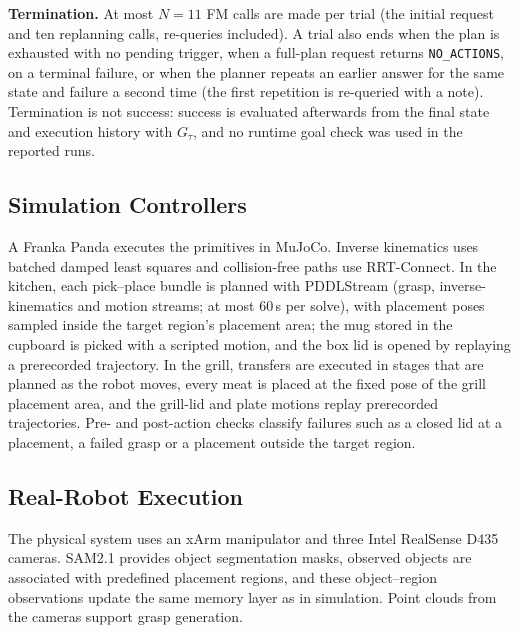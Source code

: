 \noindent\textbf{Termination.} At most $N=11$ FM calls are made per trial (the initial request and ten
replanning calls, re-queries included). A trial also ends when the plan is exhausted with no pending trigger,
when a full-plan request returns \texttt{NO\_ACTIONS}, on a terminal failure, or when the planner repeats an
earlier answer for the same state and failure a second time (the first repetition is re-queried with a note). Termination is not
success: success is evaluated afterwards from the final state and execution history with $G_\tau$, and no
runtime goal check was used in the reported runs.

\subsection{Simulation Controllers}
\label{sec:supp-controllers}
A Franka Panda executes the primitives in MuJoCo. Inverse kinematics uses batched damped least squares and
collision-free paths use RRT-Connect. In the kitchen, each pick--place bundle is planned with PDDLStream (grasp,
inverse-kinematics and motion streams; at most 60\,s per solve), with placement poses sampled inside the
target region's placement area; the mug stored in the cupboard is picked with a scripted motion, and the box lid
is opened by replaying a prerecorded trajectory. In the grill, transfers are executed in stages that are planned
as the robot moves, every meat is placed at the fixed pose of the grill placement area, and the grill-lid and
plate motions replay prerecorded trajectories. Pre- and post-action checks classify failures such as a closed lid
at a placement, a failed grasp or a placement outside the target region.

\subsection{Real-Robot Execution}
\label{sec:supp-real}
The physical system uses an xArm manipulator and three Intel RealSense D435 cameras. SAM2.1 provides object
segmentation masks, observed objects are associated with predefined placement regions, and these object--region
observations update the same memory layer as in simulation. Point clouds from the cameras support grasp
generation.

\medskip
\noindent{}
